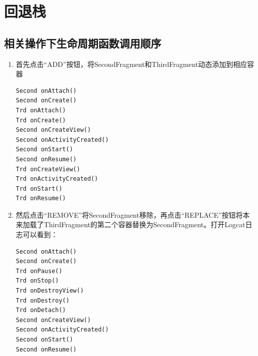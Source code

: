 \documentclass[9pt, b5paaper]{book}
\begin{document}
\section{回退栈}
\label{sec-2-11}
\subsection{相关操作下生命周期函数调用顺序}
\label{sec-2-11-1}
\begin{enumerate}
\item 首先点击“ADD”按钮，将SecondFragment和ThirdFragment动态添加到相应容器
\label{sec-2-11-1-1}
\begin{verbatim}
Second onAttach()
Second onCreate()
Trd onAttach()
Trd onCreate()
Second onCreateView()
Second onActivityCreated()
Second onStart()
Second onResume()
Trd onCreateView()
Trd onActivityCreated()
Trd onStart()
Trd onResume()
\end{verbatim}
\item 然后点击“REMOVE”将SecondFragment移除，再点击“REPLACE”按钮将本来加载了ThirdFragment的第二个容器替换为SecondFragment。打开Logcat日志可以看到：
\label{sec-2-11-1-2}
\begin{verbatim}
Second onAttach()
Second onCreate()
Trd onPause()
Trd onStop()
Trd onDestroyView()
Trd onDestroy()
Trd onDetach()
Second onCreateView()
Second onActivityCreated()
Second onStart()
Second onResume()
\end{verbatim}
\end{enumerate}
\end{document}
